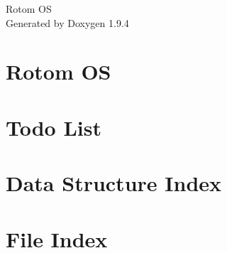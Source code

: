 \documentclass[twoside]{book}
\newcommand{\+}{\discretionary{\mbox{\scriptsize$\hookleftarrow$}}{}{}}
\newcommand{\clearemptydoublepage}{%
    \newpage{\pagestyle{empty}\cleardoublepage}%
  }
\begin{document}
  \raggedbottom
    \hypersetup{pageanchor=false,
                bookmarksnumbered=true,
                pdfencoding=unicode
               }
  \begin{titlepage}
  \vspace*{7cm}
  \begin{center}%
  {\Large Rotom OS}\\
  \vspace*{1cm}
  {\large Generated by Doxygen 1.9.4}\\
  \end{center}
  \end{titlepage}
  \clearemptydoublepage
  \tableofcontents
  \clearemptydoublepage
  \hypersetup{pageanchor=true}
\chapter{Rotom OS}
\label{md_README}

\chapter{Todo List}
\label{todo}

\chapter{Data Structure Index}

\chapter{File Index}

\end{document}
